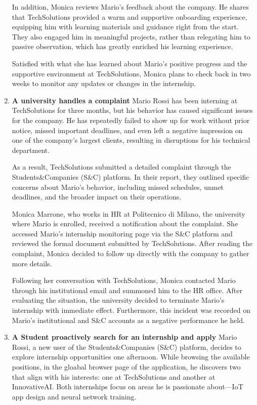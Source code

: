 \begin{enumerate}
    In addition, Monica reviews Mario’s feedback about the company. He shares that TechSolutions provided a warm and supportive onboarding experience, equipping him with learning materials and guidance right from the start. They also engaged him in meaningful projects, rather than relegating him to passive observation, which has greatly enriched his learning experience.

    Satisfied with what she has learned about Mario’s positive progress and the supportive environment at TechSolutions, Monica plans to check back in two weeks to monitor any updates or changes in the internship. 

    \item \textbf{A university handles a complaint}
    Mario Rossi has been interning at TechSolutions for three months, but his behavior has caused significant issues for the company. He has repeatedly failed to show up for work without prior notice, missed important deadlines, and even left a negative impression on one of the company’s largest clients, resulting in disruptions for his technical department.

    As a result, TechSolutions submitted a detailed complaint through the Students\&Companies (S\&C) platform. In their report, they outlined specific concerns about Mario’s behavior, including missed schedules, unmet deadlines, and the broader impact on their operations.

    Monica Marrone, who works in HR at Politecnico di Milano, the university where Mario is enrolled, received a notification about the complaint. She accessed Mario’s internship monitoring page via the S\&C platform and reviewed the formal document submitted by TechSolutions. After reading the complaint, Monica decided to follow up directly with the company to gather more details.

    Following her conversation with TechSolutions, Monica contacted Mario through his institutional email and summoned him to the HR office. After evaluating the situation, the university decided to terminate Mario’s internship with immediate effect. Furthermore, this incident was recorded on Mario’s institutional and S\&C accounts as a negative performance he held. 

     \item \textbf{A Student proactively search for an internship and apply}
     Mario Rossi, a new user of the Students\&Companies (S\&C) platform, decides to explore internship opportunities one afternoon. While browsing the available positions, in the gloabal browser page of the application, he discovers two that align with his interests: one at TechSolutions and another at InnovativeAI. Both internships focus on areas he is passionate about—IoT app design and neural network training.


\end{enumerate}
